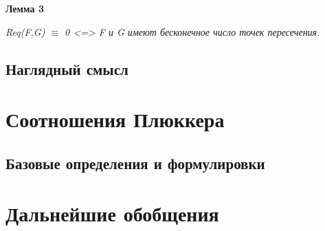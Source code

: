 \documentclass[a4paper, 12pt]{article}
\begin{document}
\textbf{Лемма 3}

\textit{Req(F,G) $\equiv$ 0 <=> F и G имеют бесконечное число точек пересечения.}


\subsection{Наглядный смысл}

\section{Соотношения Плюккера}
\subsection{Базовые определения и формулировки}
\section{Дальнейшие обобщения}
\end{document}
